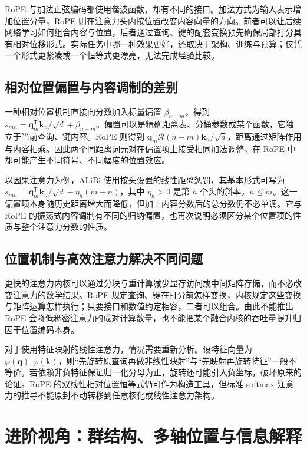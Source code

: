 \documentclass[UTF8,12pt,a4paper,fontset=fandol]{ctexart}
\begin{document}
RoPE 与加法正弦编码都使用谐波函数，却有不同的接口。加法方式为输入表示增加位置分量，RoPE 则在注意力头内按位置改变内容向量的方向。前者可以让后续网络学习如何组合内容与位置，后者通过查询、键的配套变换预先确保局部打分具有相对位移形式。实际任务中哪一种效果更好，还取决于架构、训练与预算；仅凭一个形式更紧凑或一个恒等式更漂亮，无法完成经验比较。

\subsection{相对位置偏置与内容调制的差别}
一种相对位置机制直接向分数加入标量偏置 $\beta_{n-m}$，得到 $s_{mn}=\mathbf q_m^{\mathsf T}\mathbf k_n/\sqrt d+\beta_{n-m}$。偏置可以是精确距离表、分桶参数或某个函数，它独立于当前查询、键内容。RoPE 则得到 $\mathbf q_m^{\mathsf T}\mathcal R(n-m)\mathbf k_n/\sqrt d$，距离通过矩阵作用与内容相乘。因此两个同距离词元对在偏置项上接受相同加法调整，在 RoPE 中却可能产生不同符号、不同幅度的位置效应。

以因果注意力为例，ALiBi 使用按头设置的线性距离惩罚，其基本形式可写为 $s_{mn}=\mathbf q_m^{\mathsf T}\mathbf k_n/\sqrt d-\eta_h(m-n)$，其中 $\eta_h>0$ 是第 $h$ 个头的斜率，$n\leq m$\cite{press2021}。这一偏置项本身随历史距离增大而降低，但加上内容分数后的总分数仍不必单调。它与 RoPE 的振荡式内容调制有不同的归纳偏置，也再次说明必须区分某个位置项的性质与整个注意力分数的性质。

\subsection{位置机制与高效注意力解决不同问题}
更快的注意力内核可以通过分块与重计算减少显存访问或中间矩阵存储，而不必改变注意力的数学结果。RoPE 规定查询、键在打分前怎样变换，内核规定这些变换与矩阵运算怎样执行；只要接口和数值约定相容，二者可以组合。由此不能推出 RoPE 会降低稠密注意力的成对计算数量，也不能把某个融合内核的吞吐量提升归因于位置编码本身。

对于使用特征映射的线性注意力，情况需要重新分析。设特征向量为 $\varphi(\mathbf q),\varphi(\mathbf k)$，则“先旋转原查询再做非线性映射”与“先映射再旋转特征”一般不等价。若依赖非负特征保证归一化分母为正，旋转还可能引入负坐标，破坏原来的论证。RoPE 的双线性相对位置恒等式仍可作为构造工具，但标准 softmax 注意力的推导不能原封不动转移到任意核化或线性注意力架构。

\section{进阶视角：群结构、多轴位置与信息解释}
\label{sec:rope-advanced}
\end{document}
